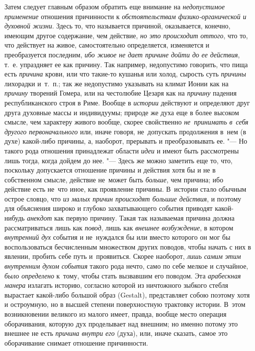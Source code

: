Затем следует главным образом обратить еще внимание на
{\em недопустимое применение} отношения причинности к
{\em обстоятельствам физико-органической и духовной жизни}. Здесь то, что
называется причиной, оказывается, конечно, имеющим другое содержание, чем
действие, {\em но это происходит оттого}, что то, что действует на живое,
самостоятельно определяется, изменяется и преобразуется последним,
{\em ибо живое не дает причине дойти до ее действия}, т.~е. упраздняет ее как
причину. Так например, недопустимо говорить, что пища есть {\em причина} крови,
или что такие-то кушанья или холод, сырость суть {\em причины} лихорадки
и~т.~п.; так же недопустимо указывать на климат Ионии как на {\em причину}
творений Гомера, или на честолюбие Цезаря как на {\em причину} падения
республиканского строя в Риме. Вообще в {\em истории} действуют и определяют
друг друга духовные массы и индивидуумы; природе же духа еще в более высоком
смысле, чем характеру живого вообще, скорее свойственно
{\em не~принимать в~себя другого первоначального} или, иначе говоря,
не~допускать продолжения в~нем (в духе) какой-либо причины, а, наоборот,
прерывать и преобразовывать ее. "--- Но такого рода отношения принадлежат
области {\em идеи} и имеют быть рассмотрены лишь тогда, когда дойдем до нее.
"--- Здесь же можно заметить еще то, что, поскольку допускается отношение
причины и действия хотя бы и не в собственном смысле, действие не~может быть
{\em больше}, чем причина; ибо действие есть не~что иное, как проявление
причины. В~истории стало обычным острое словцо, что {\em из малых причин
происходят большие действия}, и поэтому для объяснения широко и глубоко
захватывающего события приводят какой-нибудь {\em анекдот} как первую причину.
Такая так называемая причина должна рассматриваться лишь как {\em повод}, лишь
как {\em внешнее возбуждение}, в котором {\em внутренний дух} события и
не~нуждался бы или вместо которого он мог бы воспользоваться бесчисленным
множеством других поводов, чтобы начать с них в явлении, пробить себе путь
и~проявиться. Скорее наоборот, {\em лишь самим этим внутренним духом события}
такого рода нечто, само по себе мелкое и случайное, {\em было определено}
к~тому, чтобы стать вызвавшим его поводом. Эта {\em арабескная манера} излагать
историю, согласно которой из ничтожного зыбкого стебля вырастает какой-либо
большой образ (Gestalt), представляет собою поэтому хотя и остроумную, но в
высшей степени поверхностную трактовку истории. В~этом возникновении великого
из малого имеет, правда, вообще место операция оборачивания, которую дух
проделывает над внешним; но именно потому это внешнее не есть
{\em причина внутри его} (духа), или, иначе сказать, самое это оборачивание
снимает отношение причинности.


